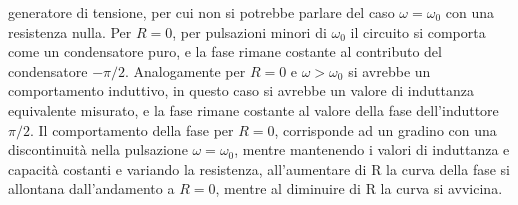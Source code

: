 \documentclass{article}
\numberwithin{equation}{subsection}
\begin{document}
generatore di tensione, per cui non si potrebbe parlare del caso $\omega=\omega_0$ con una resistenza nulla. Per $R=0$, per pulsazioni minori di $\omega_0$ il circuito 
si comporta come un condensatore puro, e la fase rimane costante al contributo del condensatore $-\pi/2$. Analogamente per $R=0$ e $\omega>\omega_0$ si avrebbe un 
comportamento induttivo, in questo caso si avrebbe un valore di induttanza equivalente misurato, e la fase rimane costante al valore della fase dell'induttore $\pi/2$. 
Il comportamento della fase per $R=0$, corrisponde ad un gradino con una discontinuità nella pulsazione $\omega=\omega_0$, mentre mantenendo i valori di induttanza e capacità 
costanti e variando la resistenza, all'aumentare di R la curva della fase si allontana dall'andamento a $R=0$, mentre al diminuire di R la curva si avvicina. 
\end{document}

